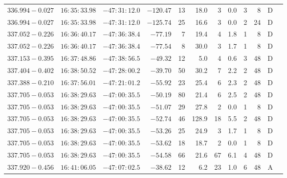 {\begin{longtable}{c rrr rrrrr rr c}
    $336.994-0.027$     &   $16:35:33.98$     &   $-47:31:12.0$     &   $-120.47 $    &   13     &   18.0    &    3   &   0.0 &   3   &   8   &   D   \\
    $336.994-0.027$     &   $16:35:33.98$     &   $-47:31:12.0$     &   $-125.74 $    &   25     &   16.6    &    3   &   0.0 &   2   &   24  &   D   \\
    $337.052-0.226$     &   $16:36:40.17$     &   $-47:36:38.4$     &   $-77.19  $    &   7      &   19.4    &    4   &   1.8 &   1   &   8   &   D   \\
    $337.052-0.226$     &   $16:36:40.17$     &   $-47:36:38.4$     &   $-77.54  $    &   8      &   30.0    &    3   &   1.7 &   1   &   8   &   D   \\
    $337.153-0.395$     &   $16:37:48.86$     &   $-47:38:56.5$     &   $-49.32  $    &   12     &    5.0    &    4   &   0.6 &   3   &   48  &   D   \\
    $337.404-0.402$     &   $16:38:50.52$     &   $-47:28:00.2$     &   $-39.70  $    &   50     &   30.2    &    7   &   2.2 &   2   &   48  &   D   \\
    $337.388-0.210$     &   $16:37:56.01$     &   $-47:21:01.2$     &   $-55.92  $    &   23     &   25.4    &    6   &   2.3 &   2   &   48  &   D   \\
    $337.705-0.053$     &   $16:38:29.63$     &   $-47:00:35.5$     &   $-50.19  $    &   80     &   21.4    &    6   &   2.5 &   2   &   48  &   D   \\
    $337.705-0.053$     &   $16:38:29.63$     &   $-47:00:35.5$     &   $-51.07  $    &   29     &   27.8    &    2   &   0.0 &   1   &   8   &   D   \\
    $337.705-0.053$     &   $16:38:29.63$     &   $-47:00:35.5$     &   $-52.74  $    &   46     &  128.9    &    18  &   5.5 &   2   &   48  &   D   \\
    $337.705-0.053$     &   $16:38:29.63$     &   $-47:00:35.5$     &   $-53.26  $    &   25     &   24.9    &    3   &   1.7 &   1   &   8   &   D   \\
    $337.705-0.053$     &   $16:38:29.63$     &   $-47:00:35.5$     &   $-53.62  $    &   18     &   18.7    &    2   &   0.0 &   1   &   8   &   D   \\
    $337.705-0.053$     &   $16:38:29.63$     &   $-47:00:35.5$     &   $-54.58  $    &   66     &   21.6    &    67  &   6.1 &   4   &   48  &   D   \\
    $337.920-0.456$     &   $16:41:06.05$     &   $-47:07:02.5$     &   $-38.62  $    &   12     &    6.2    &    23  &   1.0 &   6   &   48  &   A   \\

\end{longtable}}
